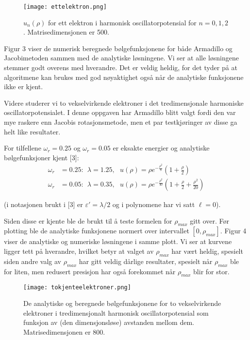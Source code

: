 \documentclass[norsk, 12pt]{article}
\newcommand{\f}{\frac}
\begin{document}
\begin{figure}
 \centering
 \texttt{[image: ettelektron.png]}
 \caption{$u_n(\rho)$ for ett elektron i harmonisk oscillatorpotensial for $n=0,1,2$. Matrisedimensjonen er 500.}
\end{figure}

Figur 3 viser de numerisk beregnede bølgefunksjonene for både Armadillo og Jacobimetoden sammen med de analytiske
løsningene. Vi ser at alle løsningene stemmer godt overens med hverandre. Det er veldig heldig, for det tyder på at
algoritmene kan brukes med god nøyaktighet også når de analytiske funksjonene ikke er kjent.

Videre studerer vi to vekselvirkende elektroner i det tredimensjonale  harmoniske oscillatorpotensialet. I denne
oppgaven har Armadillo blitt valgt fordi den var mye raskere enn Jacobis rotasjonsmetode, men et par testkjøringer av
disse ga helt like resultater.

For tilfellene $\omega_r = 0.25$ og $\omega_r = 0.05$ er eksakte energier og analytiske bølgefunksjoner kjent [3]:
\begin{align*}
 \omega_r &= 0.25:\ \ \lambda = 1.25,\ \ \ u(\rho) = \rho e^{-\f{\rho^2}{8}}\left(1+\f{\rho}{2}\right)\\
 \omega_r &= 0.05:\ \ \lambda = 0.35,\ \ \ u(\rho) = \rho  e^{-\f{\rho^2}{40}}\left(1+\f{\rho}{2}+\f{\rho^2}{20}\right)
\end{align*}

(i notasjonen brukt i [3] er $\varepsilon'=\lambda/2$ og i polynomene har vi satt $\ell=0$).

Siden disse er kjente ble de brukt til å teste formelen for $\rho_{max}$ gitt over. Før plotting ble de analytiske funksjonene
normert over intervallet $[0,\rho_{max}]$.
Figur 4 viser de analytiske og numeriske løsningene i samme plott. Vi ser at kurvene ligger tett på hverandre, hvilket
betyr at valget av $\rho_{max}$ har vært heldig, spesielt siden andre valg av $\rho_{max}$ har gitt veldig dårlige
resultater, spesielt når $\rho_{max}$ ble for liten, men redusert presisjon har også forekommet når $\rho_{max}$ blir
for stor.

\begin{figure}[h!]
 \centering
 \texttt{[image: tokjenteelektroner.png]}
 \caption{De analytiske og beregnede bølgefunksjonene for to vekselvirkende elektroner i tredimensjonalt harmonisk
 oscillatorpotensial som funksjon av (den dimensjonsløse) avstanden mellom dem. Matrisedimensjonen er 800.}
\end{figure}
\end{document}
